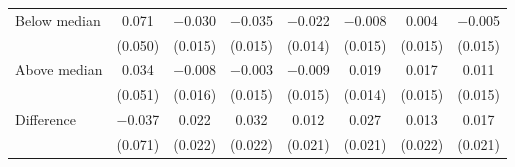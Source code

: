 \begin{tabular}[t]{lccccccc}
\hspace{1em} Below median & \num{0.071} & \num{-0.030} & \num{-0.035} & \num{-0.022} & \num{-0.008} & \num{0.004} & \num{-0.005}\\
 & (\num{0.050}) & (\num{0.015}) & (\num{0.015}) & (\num{0.014}) & (\num{0.015}) & (\num{0.015}) & (\num{0.015})\\
\hspace{1em} Above median & \num{0.034} & \num{-0.008} & \num{-0.003} & \num{-0.009} & \num{0.019} & \num{0.017} & \num{0.011}\\
 & (\num{0.051}) & (\num{0.016}) & (\num{0.015}) & (\num{0.015}) & (\num{0.014}) & (\num{0.015}) & (\num{0.015})\\\cmidrule(lr){2-8}
\hspace{1em} Difference & \num{-0.037} & \num{0.022} & \num{0.032} & \num{0.012} & \num{0.027} & \num{0.013} & \num{0.017}\\
 & (\num{0.071}) & (\num{0.022}) & (\num{0.022}) & (\num{0.021}) & (\num{0.021}) & (\num{0.022}) & (\num{0.021})\\
\end{tabular}
